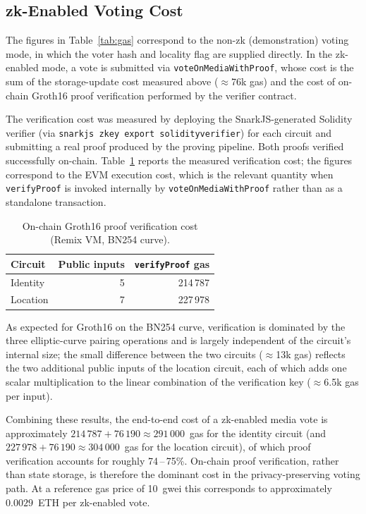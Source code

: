 \documentclass[11pt]{article}
\begin{document}
\subsection{zk-Enabled Voting Cost}

The figures in Table~\ref{tab:gas} correspond to the non-zk (demonstration)
voting mode, in which the voter hash and locality flag are supplied directly.
In the zk-enabled mode, a vote is submitted via \texttt{voteOnMediaWithProof},
whose cost is the sum of the storage-update cost measured above ($\approx$76k
gas) and the cost of on-chain Groth16 proof verification performed by the
verifier contract.

The verification cost was measured by deploying the SnarkJS-generated Solidity
verifier (via \texttt{snarkjs zkey export solidityverifier}) for each circuit
and submitting a real proof produced by the proving pipeline. Both proofs
verified successfully on-chain. Table~\ref{tab:zkverify} reports the measured
verification cost; the figures correspond to the EVM execution cost, which is
the relevant quantity when \texttt{verifyProof} is invoked internally by
\texttt{voteOnMediaWithProof} rather than as a standalone transaction.

\begin{table}[ht]
\centering
\small
\caption{On-chain Groth16 proof verification cost (Remix VM, BN254 curve).}%
\label{tab:zkverify}
\begin{tabular}{lrr}
\toprule
Circuit & Public inputs & \texttt{verifyProof} gas \\
\midrule
Identity & 5 & 214\,787 \\
Location & 7 & 227\,978 \\
\bottomrule
\end{tabular}
\end{table}

As expected for Groth16 on the BN254 curve, verification is dominated by the
three elliptic-curve pairing operations and is largely independent of the
circuit's internal size; the small difference between the two circuits
($\approx$13k gas) reflects the two additional public inputs of the location
circuit, each of which adds one scalar multiplication to the linear combination
of the verification key ($\approx$6.5k gas per input).

Combining these results, the end-to-end cost of a zk-enabled media vote is
approximately $214\,787 + 76\,190 \approx 291\,000$~gas for the identity circuit
(and $227\,978 + 76\,190 \approx 304\,000$~gas for the location circuit), of
which proof verification accounts for roughly 74\,--\,75\%. On-chain proof
verification, rather than state storage, is therefore the dominant cost in the
privacy-preserving voting path. At a reference gas price of 10~gwei this
corresponds to approximately $0.0029$~ETH per zk-enabled vote.
\end{document}
